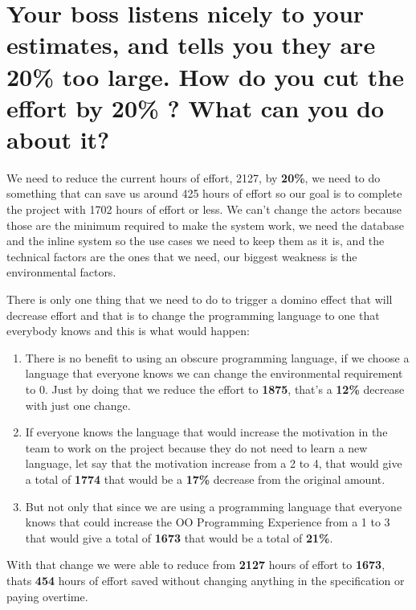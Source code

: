 \section{Your boss listens nicely to your estimates, and tells you they are 20\% too large. How do you cut the effort by 20\% ?   What can you do about it?}
\noindent
We need to reduce the current hours of effort, 2127, by \textbf{20\%}, we need to do something that can save us around 425 hours of effort so our goal is to complete the project with 1702 hours of effort or less.  \newline\newline
\noindent
We can't change the actors because those are the minimum required to make the system work, we need the database and the inline system so the use cases we need to keep them as it is, and the technical factors are the ones that we need, our biggest weakness is the environmental factors.\newline \newline

\noindent
There is only one thing that we need to do to trigger a domino effect that will decrease effort and that is to change the programming language to one that everybody knows and this is what would happen:
\begin{enumerate}
    \item There is no benefit to using an obscure programming language, if we choose a language that everyone knows we can change the environmental requirement to 0. Just by doing that we reduce the effort to \textbf{1875}, that's a \textbf{12\%} decrease with just one change.
    \item If everyone knows the language that would increase the motivation in the team to work on the project because they do not need to learn a new language, let say that the motivation increase from a 2 to 4, that would give a total of \textbf{1774} that would be a \textbf{17\%} decrease from the original amount.
    \item But not only that since we are using a programming language that everyone knows that could increase the OO Programming Experience from a 1 to 3 that would give a total of \textbf{1673} that would be a total of \textbf{21\%}.
\end{enumerate}

\noindent
With that change we were able to reduce from \textbf{2127} hours of effort to \textbf{1673}, thats \textbf{454} hours of effort saved without changing anything in the specification or paying overtime.